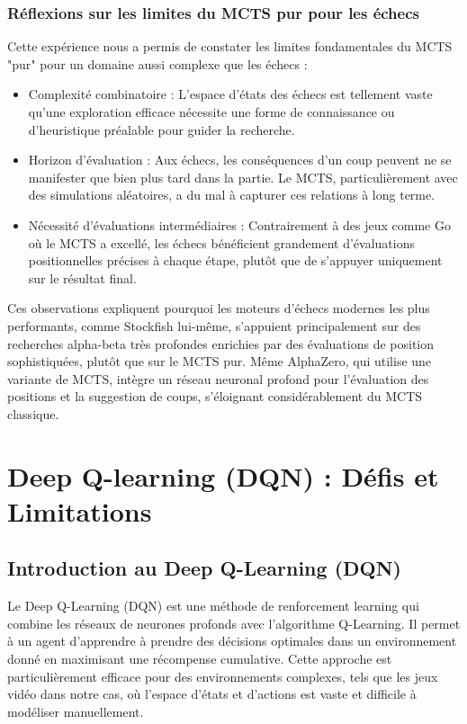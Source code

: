 \documentclass{article}
\begin{document}
    \subsubsection{Réflexions sur les limites du MCTS pur pour les échecs}

    \quad Cette expérience nous a permis de constater les limites fondamentales du MCTS "pur" pour un domaine aussi complexe que les échecs :
    \begin{itemize} 
        \item Complexité combinatoire : L'espace d'états des échecs est tellement vaste qu'une exploration efficace nécessite une forme de connaissance ou d'heuristique préalable pour guider la recherche.
        \item Horizon d'évaluation : Aux échecs, les conséquences d'un coup peuvent ne se manifester que bien plus tard dans la partie. Le MCTS, particulièrement avec des simulations aléatoires, a du mal à capturer ces relations à long terme.
        \item Nécessité d'évaluations intermédiaires : Contrairement à des jeux comme Go où le MCTS a excellé, les échecs bénéficient grandement d'évaluations positionnelles précises à chaque étape, plutôt que de s'appuyer uniquement sur le résultat final.
    \end{itemize}

    Ces observations expliquent pourquoi les moteurs d'échecs modernes les plus performants, comme Stockfish lui-même, s'appuient principalement sur des recherches alpha-beta très profondes enrichies par des évaluations de position sophistiquées, plutôt que sur le MCTS pur. Même AlphaZero, qui utilise une variante de MCTS, intègre un réseau neuronal profond pour l'évaluation des positions et la suggestion de coups, s'éloignant considérablement du MCTS classique.\\

\clearpage

\section{Deep Q-learning (DQN) : Défis et Limitations}

\subsection{Introduction au Deep Q-Learning (DQN)}

\quad Le Deep Q-Learning (DQN) est une méthode de renforcement learning qui combine les réseaux de neurones profonds avec l'algorithme Q-Learning. Il permet à un agent d'apprendre à prendre des décisions optimales dans un environnement donné en maximisant une récompense cumulative. Cette approche est particulièrement efficace pour des environnements complexes, tels que les jeux vidéo dans notre cas, où l'espace d'états et d'actions est vaste et difficile à modéliser manuellement.\\
\end{document}
